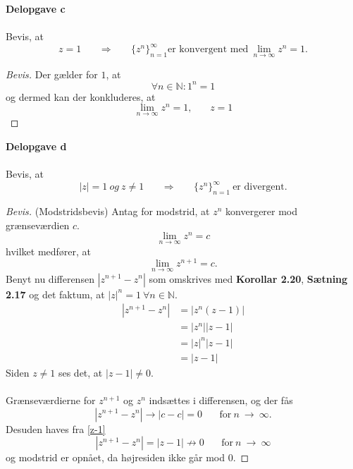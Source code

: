 \documentclass[12pt,a4paper,final]{report}
\begin{document}
\noindent \textbf{Delopgave c}\\\\
Bevis, at
\begin{equation}
z=1 \phantom{mm} \Rightarrow \phantom{mm} \{z^n\}_{n=1}^{\infty} \text{er konvergent med} \ \lim_{n \to \infty}z^n=1.
\end{equation}
\begin{proof}[Bevis]
Der gælder for $1$, at
\begin{equation}
\forall n \in \mathbb{N}: 1^n=1
\end{equation}
og dermed kan der konkluderes, at
\begin{equation}
\lim_{n \to \infty} z^n=1, \phantom{mm} z=1
\end{equation}
\end{proof}

\noindent \textbf{Delopgave d}\\\\
Bevis, at
\begin{equation}
|z|=1 \ og \ z \neq 1 \phantom{mm} \Rightarrow \phantom{mm} \{z^n\}_{n=1}^{\infty} \ \text{er divergent}.
\end{equation}
\begin{proof}[Bevis](Modstridsbevis)
Antag for modstrid, at $z^{n}$ konvergerer mod grænseværdien $c$.
\begin{equation}
\lim_{n \to \infty}z^n=c
\end{equation}
hvilket medfører, at
\begin{equation}
\lim_{n \to \infty}z^{n+1}=c.
\end{equation}
Benyt nu differensen $|z^{n+1}-z^n|$ som omskrives med \textbf{Korollar 2.20}, \textbf{Sætning 2.17} og det faktum, at $|z|^n=1 \ \forall n \in \mathbb{N}$.
\begin{align} \label{z-1}
|z^{n+1}-z^n| & = |z^n(z-1)| \nonumber \\
& = |z^n||z-1| \nonumber \\
& = |z|^n|z-1| \nonumber \\
& = |z-1|
\end{align}
Siden $z \neq 1$ ses det, at $|z-1| \neq 0$.\\\\
Grænseværdierne for $z^{n+1}$ og $z^n$ indsættes i differensen, og der fås
\begin{equation}
|z^{n+1}-z^n| \to |c-c|=0 \phantom{mm} \text{for} \ n \ \to \ \infty.
\end{equation}
Desuden haves fra \eqref{z-1}
\begin{equation}
|z^{n+1}-z^n|=|z-1| \not\to 0 \phantom{mm} \text{for} \ n \ \to \ \infty
\end{equation}
og modstrid er opnået, da højresiden ikke går mod $0$.
\end{proof}
\end{document}
